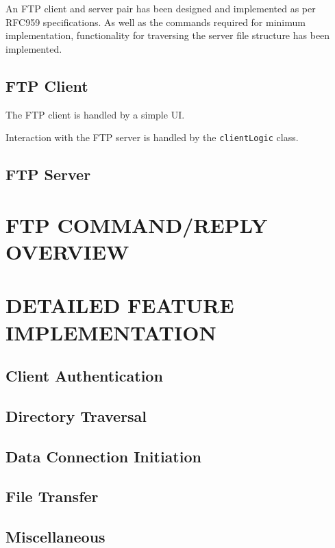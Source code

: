 \documentclass[10pt,twocolumn]{witseiepaper}
\begin{document}
An FTP client and server pair has been designed and implemented as per RFC959 specifications. As well as the commands required for minimum implementation, functionality for traversing the server file structure has been implemented. 

\subsection{FTP Client}

The FTP client is handled by a simple UI. %

Interaction with the FTP server is handled by the \texttt{clientLogic} class. 

\subsection{FTP Server}


\section{FTP COMMAND/REPLY OVERVIEW}



\section{DETAILED FEATURE IMPLEMENTATION}

\subsection{Client Authentication}

\subsection{Directory Traversal}

\subsection{Data Connection Initiation}

\subsection{File Transfer}

\subsection{Miscellaneous}
\end{document}
